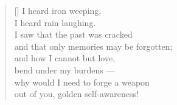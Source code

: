 \documentclass[a4paper,12pt,twoside,final]{book}
\begin{document}
\newpage


\settowidth{\versewidth}{and that only a memory can be forgotten;}

\begin{verse}[\versewidth]
  I heard iron weeping, \\
  I heard rain laughing. \\
  I saw that the past was cracked \\
  and that only memories may be forgotten; \\
  and how I cannot but love, \\
  bend under my burdens --- \\
  why would I need to forge a weapon \\
  out of you, golden self-awareness!
\end{verse}


\newpage

\settowidth{\versewidth}{}
\end{document}
